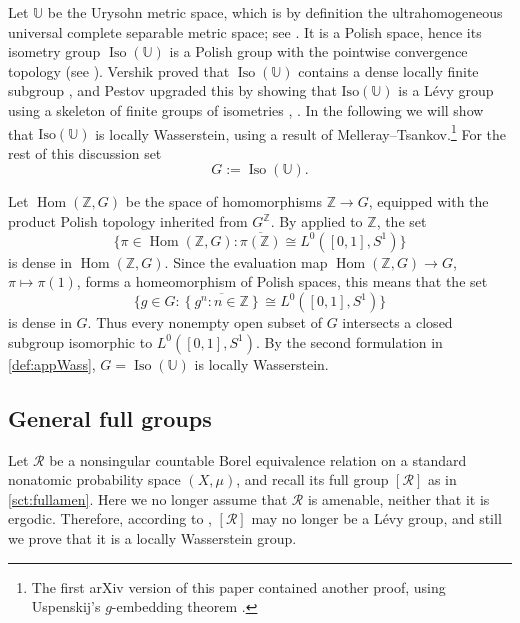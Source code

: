 \documentclass{amsart}
\numberwithin{equation}{subsection}
\theoremstyle{plain}
\theoremstyle{definition}
\theoremstyle{plain}
\begin{document}
Let \(\mathbb{U}\) be the Urysohn metric space, which is by definition the ultrahomogeneous universal complete separable metric space; see \cite[Ch.~5]{Pestov2006}. It is a Polish space, hence its isometry group \(\operatorname{Iso}\left(\mathbb{U}\right)\) is a Polish group with the pointwise convergence topology (see \cite[Prop.~5.2.1]{Pestov2006}). Vershik proved that \(\operatorname{Iso}\left(\mathbb{U}\right)\) contains a dense locally finite subgroup \cite[Thm.~5.3.8]{Pestov2006}, and Pestov upgraded this by showing that \(\mathrm{Iso}\left(\mathbb{U}\right)\) is a L\'{e}vy group using a skeleton of finite groups of isometries \cite[Thm.~5.3.10]{Pestov2006}, \cite{pestov2007isometry}. In the following we will show that \(\mathrm{Iso}\left(\mathbb{U}\right)\) is locally Wasserstein, using a result of Melleray--Tsankov.\footnote{The first arXiv version of this paper contained another proof, using Uspenskij’s \(g\)-embedding theorem \cite[Prop.~5.2.7]{Pestov2006}.} For the rest of this discussion set
\[G:=\operatorname{Iso}\left(\mathbb{U}\right).\]

\smallskip

Let \(\operatorname{Hom}\left(\mathbb{Z},G\right)\) be the space of homomorphisms \(\mathbb{Z}\to G\), equipped with the product Polish topology inherited from \(G^{\mathbb{Z}}\). By \cite[Lem.~6.2(i)]{melleray2013generic} applied to \(\mathbb{Z}\), the set
\[\big\{\pi\in\operatorname{Hom}\left(\mathbb{Z},G\right):\overline{\pi\left(\mathbb{Z}\right)}\cong L^{0}\left(\left[0,1\right],S^{1}\right)\big\}\]
is dense in \(\operatorname{Hom}\left(\mathbb{Z},G\right)\). Since the evaluation map \(\operatorname{Hom}\left(\mathbb{Z},G\right)\to G\), \(\pi\mapsto\pi\left(1\right)\), forms a homeomorphism of Polish spaces, this means that the set
\[\big\{g\in G:\overline{\left\{g^{n}:n\in\mathbb{Z}\right\}}\cong L^{0}\left(\left[0,1\right],S^{1}\right)\big\}\]
is dense in \(G\). Thus every nonempty open subset of \(G\) intersects a closed subgroup isomorphic to \(L^{0}\left(\left[0,1\right],S^{1}\right)\). By the second formulation in \cref{def:appWass}, \(G=\operatorname{Iso}\left(\mathbb{U}\right)\) is locally Wasserstein.

\subsection{General full groups}\label{sct:fullnonamen}

Let \(\mathcal{R}\) be a nonsingular countable Borel equivalence relation on a standard nonatomic probability space \(\left(X,\mu\right)\), and recall its full group \(\left[\mathcal{R}\right]\) as in \cref{sct:fullamen}. Here we no longer assume that \(\mathcal{R}\) is amenable, neither that it is ergodic. Therefore, according to \cite[Thm.~5.7]{giordano2007some}, \(\left[\mathcal{R}\right]\) may no longer be a L\'{e}vy group, and still we prove that it is a locally Wasserstein group.
\end{document}
